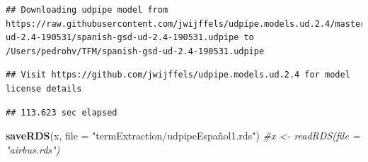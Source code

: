\documentclass[]{article}
\newenvironment{Shaded}{\begin{snugshade}}{\end{snugshade}}
\newcommand{\CharTok}[1]{\textcolor[rgb]{0.31,0.60,0.02}{#1}}
\newcommand{\CommentTok}[1]{\textcolor[rgb]{0.56,0.35,0.01}{\textit{#1}}}
\newcommand{\DataTypeTok}[1]{\textcolor[rgb]{0.13,0.29,0.53}{#1}}
\newcommand{\KeywordTok}[1]{\textcolor[rgb]{0.13,0.29,0.53}{\textbf{#1}}}
\newcommand{\NormalTok}[1]{#1}
\newcommand{\OperatorTok}[1]{\textcolor[rgb]{0.81,0.36,0.00}{\textbf{#1}}}
\newcommand{\StringTok}[1]{\textcolor[rgb]{0.31,0.60,0.02}{#1}}
\begin{document}
\begin{verbatim}
## Downloading udpipe model from https://raw.githubusercontent.com/jwijffels/udpipe.models.ud.2.4/master/inst/udpipe-ud-2.4-190531/spanish-gsd-ud-2.4-190531.udpipe to /Users/pedrohv/TFM/spanish-gsd-ud-2.4-190531.udpipe
\end{verbatim}

\begin{verbatim}
## Visit https://github.com/jwijffels/udpipe.models.ud.2.4 for model license details
\end{verbatim}

\begin{Shaded}
\end{Shaded}

\begin{verbatim}
## 113.623 sec elapsed
\end{verbatim}

\begin{Shaded}
\begin{Highlighting}[]
\KeywordTok{saveRDS}\NormalTok{(x, }\DataTypeTok{file =} \StringTok{"termExtraction/udpipeEspañol1.rds"}\NormalTok{)}
\CommentTok{#x <- readRDS(file = "airbus.rds")}
\end{Highlighting}
\end{Shaded}

\begin{Shaded}
\end{Shaded}
\end{document}
